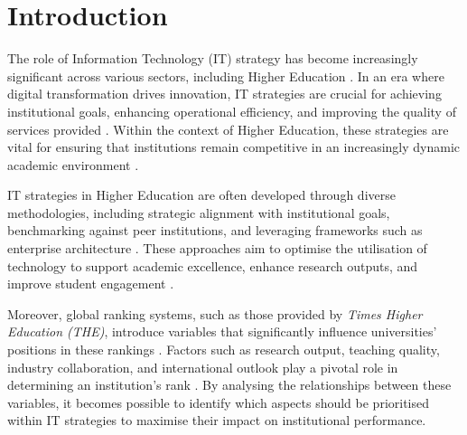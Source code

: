 \documentclass[sigconf]{acmart}
\begin{document}

\maketitle

\section{Introduction}


The role of Information Technology (IT) strategy has become increasingly significant across various sectors, including Higher Education \cite{hashim2021higher}. In an era where digital transformation drives innovation, IT strategies are crucial for achieving institutional goals, enhancing operational efficiency, and improving the quality of services provided \cite{rahmadi2024research}. Within the context of Higher Education, these strategies are vital for ensuring that institutions remain competitive in an increasingly dynamic academic environment \cite{fernandez2023digital}.

IT strategies in Higher Education are often developed through diverse methodologies, including strategic alignment with institutional goals, benchmarking against peer institutions, and leveraging frameworks such as enterprise architecture \cite{bianchi2023it}. These approaches aim to optimise the utilisation of technology to support academic excellence, enhance research outputs, and improve student engagement \cite{digitalsystems2022strategy}.

Moreover, global ranking systems, such as those provided by \textit{Times Higher Education (THE)}, introduce variables that significantly influence universities' positions in these rankings \cite{times2023methodology}. Factors such as research output, teaching quality, industry collaboration, and international outlook play a pivotal role in determining an institution’s rank \cite{times2022rankings}. By analysing the relationships between these variables, it becomes possible to identify which aspects should be prioritised within IT strategies to maximise their impact on institutional performance.
\end{document}
